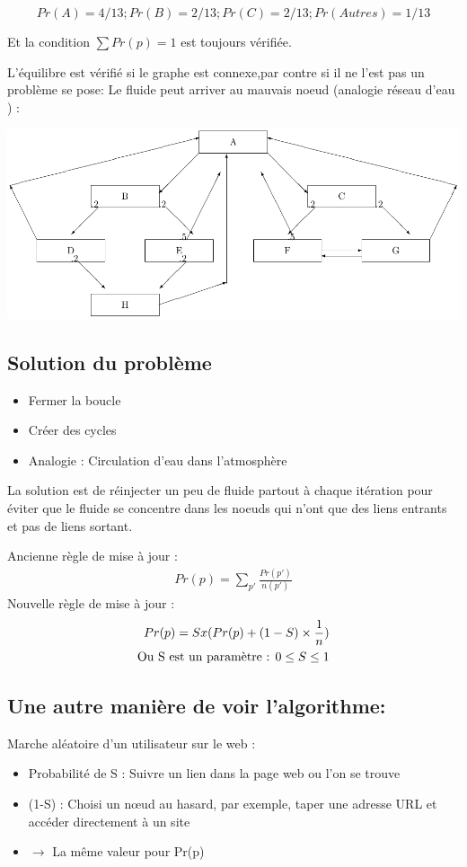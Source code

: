 	$$Pr(A) = 4/13 ; Pr(B) = 2/13 ; Pr(C) = 2/13 ; Pr(Autres) = 1/13$$
 
Et la condition $\sum Pr(p) = 1$ est toujours vérifiée.
 
 L'équilibre est vérifié si le graphe est connexe,par contre si il ne l'est pas un problème se pose: Le fluide peut arriver au mauvais noeud (analogie réseau d'eau )  :

\includegraphics[scale=0.8]{images/24_Nconnexe.pdf}

\subsection*{Solution du problème}
\begin{itemize}
\item Fermer la boucle
\item Créer des cycles
\item Analogie : Circulation d'eau dans l'atmosphère
\end{itemize}
 	La solution est de réinjecter un peu de fluide partout à chaque itération pour éviter que le fluide se concentre dans les noeuds qui n'ont que des liens entrants et pas de liens sortant.

	Ancienne règle de mise à jour :
	\begin{align*}
	Pr(p) =  \sum_ {p'}\frac{Pr(p')}{n(p')}
	\end{align*}
 	Nouvelle règle de mise à jour : \\
	\begin{align*}
         Pr(p) = Sx(Pr(p) + (1-S)  \times \frac{1}{n}) \\
	 \text{Ou S est un paramètre : $ 0 \le S \le 1 $} 
	\end{align*}
        
\subsection*{ Une autre manière de voir l'algorithme:}
        Marche aléatoire d'un utilisateur sur le web : 
	\begin{itemize}
        \item Probabilité de S : Suivre un lien dans la page web ou l'on se trouve \\
        \item (1-S) : Choisi un n\oe ud au hasard, par exemple, taper une adresse URL et accéder directement à un site \\
        \item $\rightarrow $ La même valeur pour Pr(p) \\
	\end{itemize}
	
